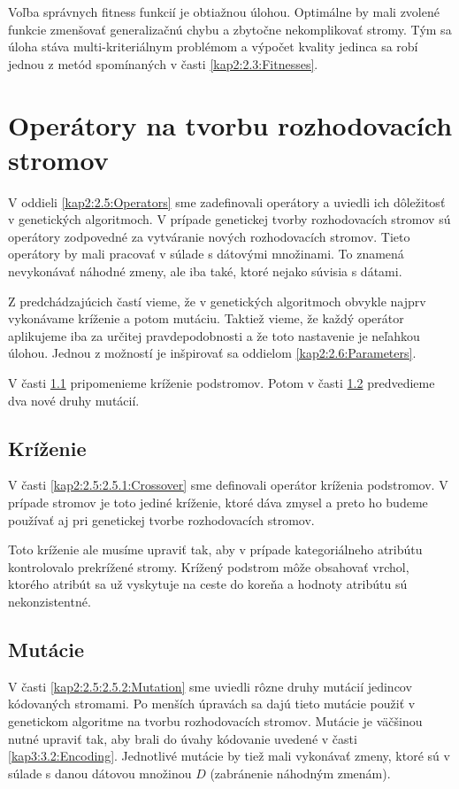 Voľba správnych fitness funkcií je obtiažnou úlohou. Optimálne by mali zvolené funkcie zmenšovať generalizačnú chybu a zbytočne nekomplikovať stromy. Tým sa úloha stáva multi-kriteriálnym problémom a výpočet kvality jedinca sa robí jednou z metód spomínaných v časti \ref{kap2:2.3:Fitnesses}.
\section{Operátory na tvorbu rozhodovacích stromov}\label{kap3:3.4:Operators}
V oddieli \ref{kap2:2.5:Operators} sme zadefinovali operátory a uviedli ich dôležitosť v genetických algoritmoch. V prípade genetickej tvorby rozhodovacích stromov sú operátory zodpovedné za vytváranie nových rozhodovacích stromov. Tieto operátory by mali pracovať v súlade s dátovými množinami. To znamená nevykonávať náhodné zmeny, ale iba také, ktoré nejako súvisia s dátami.

Z predchádzajúcich častí vieme, že v genetických algoritmoch obvykle najprv vykonávame kríženie a potom mutáciu. Taktiež vieme, že každý operátor aplikujeme iba za určitej pravdepodobnosti a že toto nastavenie je neľahkou úlohou. Jednou z možností je inšpirovať sa oddielom \ref{kap2:2.6:Parameters}.

V časti \ref{kap3:3.4:3.4.1:Crossover} pripomenieme kríženie podstromov. Potom v časti \ref{kap3:3.4:3.4.2:Mutation} predvedieme dva nové druhy mutácií.

\subsection{Kríženie}\label{kap3:3.4:3.4.1:Crossover}
V časti \ref{kap2:2.5:2.5.1:Crossover} sme definovali operátor kríženia podstromov. V prípade stromov je toto jediné kríženie, ktoré dáva zmysel a preto ho budeme používať aj pri genetickej tvorbe rozhodovacích stromov. 

Toto kríženie ale musíme upraviť tak, aby v prípade kategoriálneho atribútu kontrolovalo prekrížené stromy. Krížený podstrom môže obsahovať vrchol, ktorého atribút sa už vyskytuje na ceste do koreňa a hodnoty atribútu sú nekonzistentné.

\subsection{Mutácie}\label{kap3:3.4:3.4.2:Mutation}
V časti \ref{kap2:2.5:2.5.2:Mutation} sme uviedli rôzne druhy mutácií jedincov kódovaných stromami. Po menších úpravách sa dajú tieto mutácie použiť v genetickom algoritme na tvorbu rozhodovacích stromov. Mutácie je väčšinou nutné upraviť tak, aby brali do úvahy kódovanie uvedené v časti \ref{kap3:3.2:Encoding}. Jednotlivé mutácie by tiež mali vykonávať zmeny, ktoré sú v súlade s danou dátovou množinou $D$ (zabránenie náhodným zmenám).

